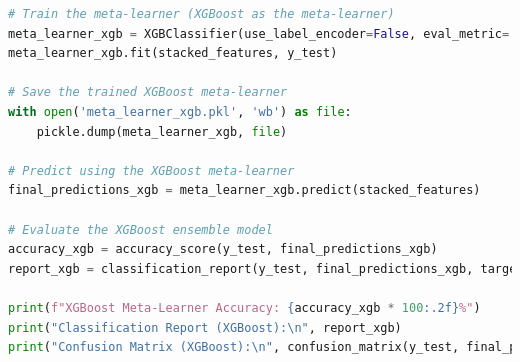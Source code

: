 \begin{tcolorbox}[colback=gray!5!white, colframe=gray!80!black, boxrule=0.5pt, title=Evaluate Meta-Learner and Ensemble Model 2]
    \begin{lstlisting}[language=Python]
# Train the meta-learner (XGBoost as the meta-learner)
meta_learner_xgb = XGBClassifier(use_label_encoder=False, eval_metric='mlogloss')
meta_learner_xgb.fit(stacked_features, y_test)

# Save the trained XGBoost meta-learner
with open('meta_learner_xgb.pkl', 'wb') as file:
    pickle.dump(meta_learner_xgb, file)

# Predict using the XGBoost meta-learner
final_predictions_xgb = meta_learner_xgb.predict(stacked_features)

# Evaluate the XGBoost ensemble model
accuracy_xgb = accuracy_score(y_test, final_predictions_xgb)
report_xgb = classification_report(y_test, final_predictions_xgb, target_names=label_encoder.classes_)

print(f"XGBoost Meta-Learner Accuracy: {accuracy_xgb * 100:.2f}%")
print("Classification Report (XGBoost):\n", report_xgb)
print("Confusion Matrix (XGBoost):\n", confusion_matrix(y_test, final_predictions_xgb))
\end{lstlisting}
\end{tcolorbox}
 
